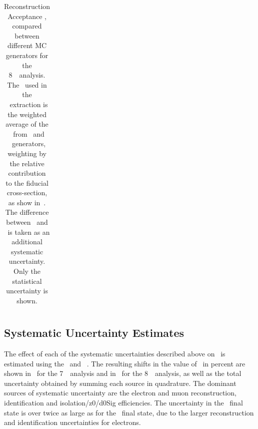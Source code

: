 \begin{table}[htbp]
\begin{tabular}{l c c c c}


    \end{tabular}
    \caption[Reconstruction Acceptance \CZZ, compared between different MC
    generators for the 8~\tev\ analysis.]{Reconstruction Acceptance \CZZ, compared between different MC
    generators for the 8~\tev\ analysis. The \CZZ\ used in the \cx\ extraction is the
    weighted average of the \CZZ\ from \powhegbox\ and \ggtwoZZ\ generators, weighting
    by the relative contribution to the fiducial cross-section, as show in~.
    The difference between \powhegbox\ and \sherpa\ is taken as an additional
    systematic uncertainty.
    Only the statistical uncertainty is shown. 
    }
    \label{table:objSel-syst-genComp-eight}
\end{table}

\subsection{Systematic Uncertainty Estimates}

The effect of each of the systematic uncertainties described above on \CZZ\ is estimated using
the \powhegbox\ and \ggZZ\ \mc. The resulting shifts in the value of \CZZ\ in
percent are shown in~ for the 7~\tev\ analysis and
in~ for the 8~\tev\ analysis, as well as the total
uncertainty obtained by summing each source in quadrature. The
dominant sources of systematic uncertainty are the electron and muon reconstruction,
identification and isolation/z0/d0Sig efficiencies. The
uncertainty in the \eeee\ final state is over twice as large as for the \mmmm\
final state, due to the larger reconstruction and identification uncertainties
for electrons.


